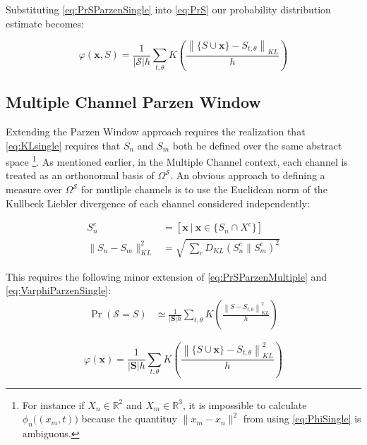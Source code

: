 \documentclass[10pt]{article}
\begin{document}
Substituting \ref{eq:PrSParzenSingle} into \ref{eq:PrS} our probability distribution estimate becomes:

\begin{equation} \label{eq:VarphiParzenSingle}
\varphi(\mathbf{x}, S) = \frac{1}{|\mathcal{S}| h} \sum_{t,\theta} K \left( \frac{ \left\| \{ S \cup \mathbf{x} \} - S_{t,\theta} \right\|_{KL} } { h } \right)
\end{equation}


\subsection{ Multiple Channel Parzen Window}

Extending the Parzen Window approach requires the realization that \ref{eq:KLsingle} requires that \( S_n \) and \( S_m \) both be defined over the same abstract space \footnote{ For instance if \( X_n \in \mathbb{R}^2 \) and \( X_m \in \mathbb{R}^3 \), it is impossible to calculate \( \phi_n\big( (x_m,t) \big) \) because the quantituy \( \| x_m - x_n \|^2 \) from using \ref{eq:PhiSingle} is ambiguous.}.  As mentioned earlier, in the Multiple Channel context, each channel is treated as an orthonormal basis of \( \Omega^\mathcal{S} \).  An obvious approach to defining a measure over \( \Omega^\mathcal{S} \) for mutliple channels is to use the Euclidean norm of the Kullbeck Liebler divergence of each channel considered independently:

\begin{align} 
S_n^c &= [ \mathbf{x} \ | \ \mathbf{x} \in \{ S_n \cap X^c \} ] \nonumber \\
\| S_n - S_m \|_{KL}^2 &= \sqrt{ \ \sum_c D_{KL}( S_n^c \| S_m^c )^2 } \label{eq:NormMultiple}
\end{align}

This requires the following minor extension of \ref{eq:PrSParzenMultiple} and \ref{eq:VarphiParzenSingle}:
\begin{align} \label{eq:PrSParzenMultiple}
\Pr( \mathcal{S} = S ) &\simeq \frac{1}{|\mathbf{S}| h} \sum_{t,\theta} K \left( \frac{ \left\| S - S_{t,\theta} \right\|_{KL}^2 } { h } \right)
\end{align}

\begin{equation} \label{eq:VarphiParzenMultiple}
\varphi(\mathbf{x}) = \frac{1}{ | \mathbf{S} | h} \sum_{t,\theta} K \left( \frac{ \left\| \{ S \cup \mathbf{x} \} - S_{t,\theta} \right\|_{KL}^2 } { h } \right)
\end{equation}
\end{document}

